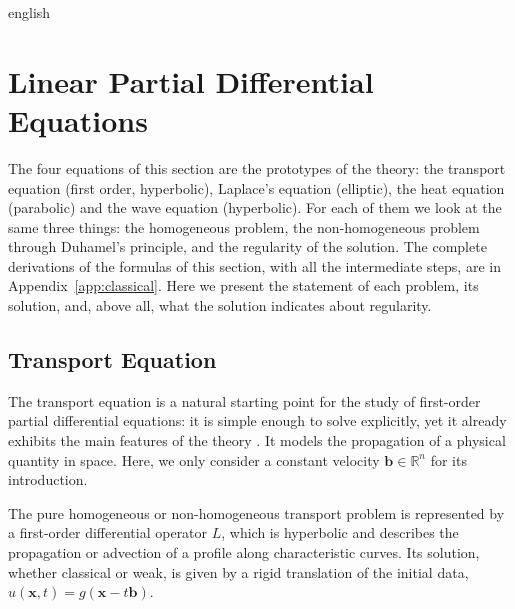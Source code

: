 \begin{hyphenrules}{english}
\section{Linear Partial Differential Equations}\label{sec:linear-pdes}

The four equations of this section are the prototypes of the theory: the transport equation (first
order, hyperbolic), Laplace's equation (elliptic), the heat equation (parabolic) and the wave equation
(hyperbolic). For each of them we look at the same three things: the homogeneous problem, the
non-homogeneous problem through Duhamel's principle, and the regularity of the solution.
The complete derivations of the formulas of this section, with all the intermediate steps, are in
Appendix~\ref{app:classical}. Here we present the statement of each problem, its solution, and, above all, what the solution indicates about regularity.

\subsection{Transport Equation}\label{subsec:transport}

The transport equation is a natural starting point for the study of first-order partial differential
equations: it is simple enough to solve explicitly, yet it already exhibits the main features of the
theory \cite{evans2010}. It models the propagation of a physical quantity in space. Here, we only
consider a constant velocity $\mathbf{b}\in\mathbb{R}^n$ for its introduction.

The pure homogeneous or non-homogeneous transport problem is represented by a first-order differential
operator $L$, which is hyperbolic and describes the propagation or advection of a profile along
characteristic curves. Its solution, whether classical or weak, is given by a rigid translation of the
initial data, $u(\mathbf{x},t)=g(\mathbf{x}-t\mathbf{b})$.


\end{hyphenrules}

